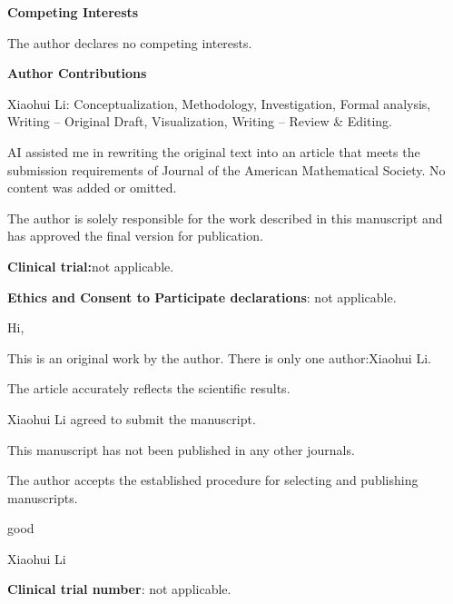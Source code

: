 \documentclass[a4paper,11pt]{article}
\begin{document}
 \textbf{\textbf{Competing Interests}}

The author declares no competing interests.

 \textbf{\textbf{Author Contributions}}

Xiaohui Li: Conceptualization, Methodology, Investigation, Formal analysis, Writing – Original Draft, Visualization, Writing – Review \& Editing.

AI assisted me in rewriting the original text into an article that meets the submission requirements of Journal of the American Mathematical Society. No content was added or omitted.

 The author is solely responsible for the work described in this manuscript and has approved the final version for publication.

 \textbf{\textbf{Clinical trial:}}not applicable.

 \textbf{\textbf{Ethics and Consent to Participate declarations}}: not applicable.

 Hi,

This is an original work by the author. There is only one author:Xiaohui Li.

The article accurately reflects the scientific results.

Xiaohui Li agreed to submit the manuscript.

This manuscript has not been published in any other journals.

The author accepts the established procedure for selecting and publishing manuscripts.

good

Xiaohui Li



 \textbf{\textbf{Clinical trial number}}: not applicable.
\end{document}
